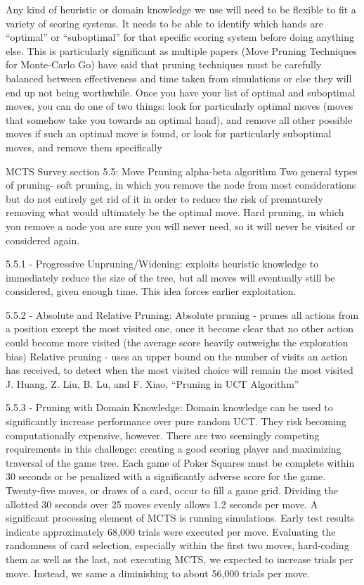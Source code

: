 \documentclass[letterpaper]{article}
\begin{document}
Any kind of heuristic or domain knowledge we use will need to be flexible to fit a variety of scoring systems. It needs to be able to identify which hands are “optimal” or “suboptimal” for that specific scoring system before doing anything else. 
This is particularly significant as multiple papers (Move Pruning Techniques for Monte-Carlo Go) have said that pruning techniques must be carefully balanced between effectiveness and time taken from simulations or else they will end up not being worthwhile. 
Once you have your list of optimal and suboptimal moves, you can do one of two things:
look for particularly optimal moves (moves that somehow take you towards an optimal hand), and remove all other possible moves if such an optimal move is found, or
look for particularly suboptimal moves, and remove them specifically

MCTS Survey section 5.5: Move Pruning
	alpha-beta algorithm
	Two general types of pruning- soft pruning, in which you remove the node from most considerations but do not entirely get rid of it in order to reduce the risk of prematurely removing what would ultimately be the optimal move.
	Hard pruning, in which you remove a node you are sure you will never need, so it will never be visited or considered again.

5.5.1 - Progressive Unpruning/Widening: exploits heuristic knowledge to immediately reduce the size of the tree, but all moves will eventually still be considered, given enough time. This idea forces earlier exploitation.

5.5.2 - Absolute and Relative Pruning:
	Absolute pruning - prunes all actions from a position except the most visited one, once it become clear that no other action could become more visited (the average score heavily outweighs the exploration bias)
	Relative pruning - uses an upper bound on the number of visits an action has received, to detect when the most visited choice will remain the most visited 
	J. Huang, Z. Liu, B. Lu, and F. Xiao, “Pruning in UCT Algorithm”


5.5.3 - Pruning with Domain Knowledge: Domain knowledge can be used to significantly increase performance over pure random UCT. They risk becoming computationally expensive, however.
There are two seemingly competing requirements in this challenge: creating a good scoring player and maximizing traversal of the game tree. Each game of Poker Squares must be complete within 30 seconds or be penalized with a significantly adverse score for the game. Twenty-five moves, or draws of a card, occur to fill a game grid. Dividing the allotted 30 seconds over 25 moves evenly allows 1.2 seconds per move. A significant processing element of MCTS is running simulations. Early test results indicate approximately 68,000 trials were executed per move. Evaluating the randomness of card selection, especially within the first two moves, hard-coding them as well as the last, not executing MCTS, we expected to increase trials per move. Instead, we same a diminishing to about 56,000 trials per move.
\end{document}
